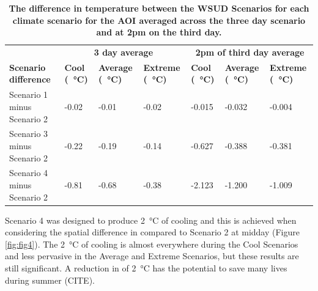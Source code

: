 \documentclass[final,3p,times,authoryear]{elsarticle}
\begin{document}
\begin{table}[!htbp]
\caption{\bf The difference in  temperature between the WSUD Scenarios for each climate scenario for the AOI averaged across the three day scenario and at 2pm on the third day. \label{tab:scenarioDiffRep2}}     
\begin{tabular}{ l l l l l l l}
 \hline  \multicolumn{1}{|c}{}   &  \multicolumn{3}{|c|}{\textbf{3 day average}} & \multicolumn{3}{c|}{\textbf{2pm of third day average}}  \\
\textbf{Scenario difference} 
& \textbf{Cool (\SI{}{\degreeCelsius})}
& \textbf{Average (\SI{}{\degreeCelsius})}
& \textbf{Extreme (\SI{}{\degreeCelsius})}
& \textbf{Cool (\SI{}{\degreeCelsius})}
& \textbf{Average (\SI{}{\degreeCelsius})}
& \textbf{Extreme (\SI{}{\degreeCelsius})}
\\ \hline
Scenario 1 minus Scenario 2 & -0.02  & -0.01 & -0.02 &-0.015&-0.032&-0.004\\ 
Scenario 3 minus Scenario 2 & -0.22  & -0.19 & -0.14 &-0.627&-0.388&-0.381\\ 
Scenario 4 minus Scenario 2 & -0.81  & -0.68 & -0.38 &-2.123&-1.200&-1.009\\ 
\hline
\end{tabular}
\end{table}



Scenario 4 was designed to produce 2\SI{}{\degreeCelsius} of cooling and this is achieved when considering the spatial difference in  compared to Scenario 2 at midday (Figure \ref{fig:fig4}). The 2\SI{}{\degreeCelsius} of cooling is almost everywhere during the Cool Scenarios and less pervasive in the Average and Extreme Scenarios, but these results are still significant. A reduction in  of 2\SI{}{\degreeCelsius} has the potential to save many lives during summer (CITE).
\end{document}
